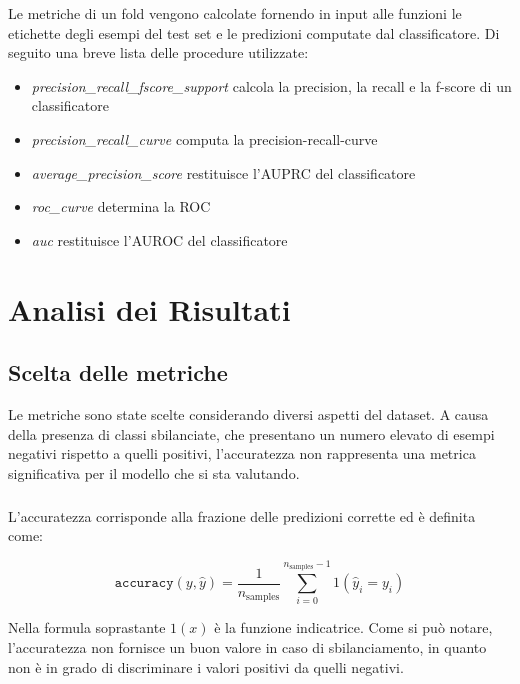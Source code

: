 \documentclass[12pt,a4paper,oneside,hidelinks]{report}
\begin{document}
Le metriche di un fold vengono calcolate fornendo in input alle funzioni le etichette degli esempi del test set e le predizioni computate dal classificatore. Di seguito una breve lista delle procedure utilizzate:

\begin{itemize}
\item \textit{precision\_recall\_fscore\_support} calcola la precision, la recall e la f-score di un classificatore

\item \textit{precision\_recall\_curve} computa la precision-recall-curve

\item \textit{average\_precision\_score} restituisce l'AUPRC del classificatore 

\item \textit{roc\_curve} determina la ROC

\item \textit{auc} restituisce l'AUROC del classificatore
\end{itemize}


\chapter{Analisi dei Risultati}
\label{chap:risultati}

\section{Scelta delle metriche}
Le metriche sono state scelte considerando diversi aspetti del dataset.
A causa della presenza di classi sbilanciate, che presentano un numero elevato di esempi negativi rispetto a quelli positivi, l'accuratezza non rappresenta una metrica significativa per il modello che si sta valutando.

\paragraph*{}
L'accuratezza corrisponde alla frazione delle predizioni corrette ed è definita come:

\begin{equation}
\texttt{accuracy}(y, \hat{y}) = \frac{1}{n_\text{samples}} \sum_{i=0}^{n_\text{samples}-1} 1(\hat{y}_i = y_i)
\end{equation}

Nella formula soprastante $1(x)$ è la funzione indicatrice. Come si può notare, l'accuratezza non fornisce un buon valore in caso di sbilanciamento, in quanto non è in grado di discriminare i valori positivi da quelli negativi.
\end{document}
